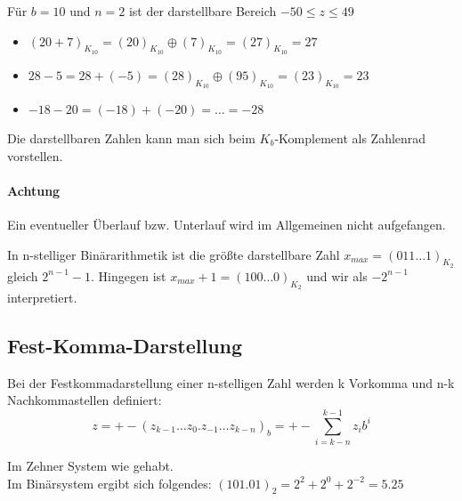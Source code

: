 \begin{example}
Für $b=10$ und $n=2$ ist der darstellbare Bereich $-50 \le  z \le 49$
\begin{itemize}
	\item $(20+7)_{K_{10}} = (20)_{K_{10}} \oplus (7)_{K_{10}} =(27)_{K_{10}}=27$
	\item $28-5 = 28+ (-5)= (28)_{K_{10}} \oplus (95)_{K_{10}} = (23)_{K_{10}} =23 $
	\item $-18-20= (-18)+(-20) = \ldots = -28$
\end{itemize}
\end{example}
Die darstellbaren Zahlen kann man sich beim $K_b$-Komplement als Zahlenrad vorstellen.


\paragraph{Achtung} Ein eventueller Überlauf bzw. Unterlauf wird im Allgemeinen nicht aufgefangen.
\begin{example}
In n-stelliger Binärarithmetik ist die größte darstellbare Zahl $x_{max} = (011\ldots 1)_{K_2}$ gleich  $2^{n-1}-1$. Hingegen ist $x_{max}+1=(100\ldots 0)_{K_2}$ und wir als $-2^{n-1}$ interpretiert.
\end{example}
\subsection{Fest-Komma-Darstellung}
\begin{definition}
	Bei der Festkommadarstellung einer n-stelligen Zahl werden k Vorkomma und n-k Nachkommastellen definiert:
	\[
	z=+-(z_{k-1} \ldots z_0.z_{-1} \ldots z_{k-n})_b = +- \sum_{i=k-n}^{k-1}z_i b^{i}
	\]

\end{definition}
\begin{example}
Im Zehner System wie gehabt.\\
Im Binärsystem ergibt sich folgendes: $(101.01)_2= 2^{2}+ 2^{0}+ 2^{-2}=5.25$
\end{example}
